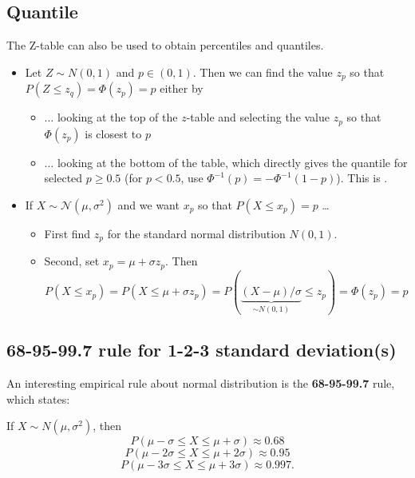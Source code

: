 \documentclass[
]{book}
\providecommand{\tightlist}{%
  \setlength{\itemsep}{0pt}\setlength{\parskip}{0pt}}
\theoremstyle{definition}
\theoremstyle{definition}
\theoremstyle{definition}
\theoremstyle{definition}
\theoremstyle{remark}
\begin{document}
\subsection{Quantile}\label{quantile-1}

The Z-table can also be used to obtain percentiles and quantiles.

\begin{itemize}
\tightlist
\item
  Let \(Z\sim N(0,1)\) and \(p\in(0,1)\). Then we can find the value \(z_p\) so that \(P(Z\leq z_q)=\Phi(z_p)=p\) either by

  \begin{itemize}
  \tightlist
  \item
    \(\dots\) looking at the top of the \(z\)-table and selecting the value \(z_p\) so that \(\Phi(z_p)\) is closest to \(p\)
  \item
    \(\dots\) looking at the bottom of the table, which directly gives the quantile for selected \(p\geq 0.5\) (for \(p<0.5\), use \(\Phi^{-1}(p)=-\Phi^{-1}(1-p)\)). This is .
  \end{itemize}
\item
  If \(X \sim \mathcal{N}(\mu,\sigma^2)\) and we want \(x_p\) so that \(P(X\leq x_p)=p\) \dots

  \begin{itemize}
  \tightlist
  \item
    First find \(z_p\) for the standard normal distribution \(N(0,1)\).
  \item
    Second, set \(x_p= \mu + \sigma z_p\). Then
    \[P(X\leq x_p) = P(X\leq \mu+\sigma z_p)=P\left( \underbrace{(X-\mu)/\sigma}_{\sim N(0,1)} \leq z_p\right)=\Phi(z_p)=p\]
  \end{itemize}
\end{itemize}

\subsection{68-95-99.7 rule for 1-2-3 standard deviation(s)}\label{rule-for-1-2-3-standard-deviations}

An interesting empirical rule about normal distribution is the \textbf{68-95-99.7} rule, which states:

If \(X \sim N(\mu, \sigma^2)\), then
\[
P( \mu - \sigma \le X \le \mu + \sigma) \approx 0.68
\]
\[
P( \mu - 2\sigma \le X \le \mu + 2\sigma) \approx 0.95
\]
\[
P( \mu - 3\sigma \le X \le \mu + 3\sigma) \approx  0.997.
\]
\end{document}
